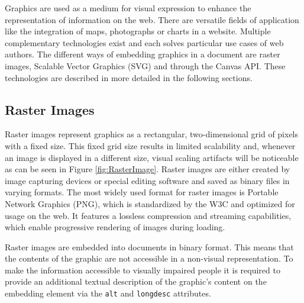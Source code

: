 Graphics are used as a medium for visual expression to enhance the representation of information on the web. There are versatile fields of application like the integration of maps, photographs or charts in a website. Multiple complementary technologies exist and each solves particular use cases of web authors. The different ways of embedding graphics in a document are raster images, Scalable Vector Graphics (SVG) and through the Canvas API. These technologies are described in more detailed in the following sections.

\subsection{Raster Images}

Raster images represent graphics as a rectangular, two-dimensional grid of pixels with a fixed size. This fixed grid size results in limited scalability and, whenever an image is displayed in a different size, visual scaling artifacts will be noticeable as can be seen in Figure \ref{fig:RasterImage}. Raster images are either created by image capturing devices or special editing software and saved as binary files in varying formats. The most widely used format for raster images is Portable Network Graphics (PNG), which is standardized by the W3C \parencite{PNG} and optimized for usage on the web. It features a lossless compression and streaming capabilities, which enable progressive rendering of images during loading.

Raster images are embedded into documents in binary format. This means that the contents of the graphic are not accessible in a non-visual representation. To make the information accessible to visually impaired people it is required to provide an additional textual description of the graphic's content on the embedding element via the \lstinline{alt} and \lstinline{longdesc} attributes.

